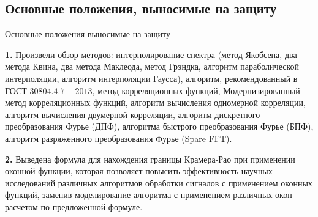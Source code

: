 %	
%	
%	
%	

\subsection{Основные положения, выносимые на защиту}
\begin{frame}{Основные положения выносимые на защиту}
\begin{block}{}
	\textbf{1.} Произвели обзор методов: интерполирование спектра (метод Якобсена, два метода Квина, два метода Маклеода, метод Грэндка, алгоритм параболической интерполяции, алгоритм интерполяции Гаусса), алгоритм, рекомендованный в ГОСТ $30804.4.7-2013$, метод корреляционных  функций, Модернизированный метод корреляционных функций, алгоритм вычисления одномерной корреляции, алгоритм вычисления двумерной корреляции, алгоритм дискретного преобразования Фурье (ДПФ), алгоритма быстрого преобразования Фурье (БПФ), алгоритм разряженного преобразования Фурье (Spare FFT). 
\end{block} 
 
	\textbf{2.} Выведена формула для нахождения границы Крамера-Рао при применении оконной функции, которая позволяет повысить эффективность научных исследований различных алгоритмов обработки сигналов с применением оконных функций, заменив моделирование алгоритма с применением различных окон расчетом по предложенной формуле.
\end{frame}

